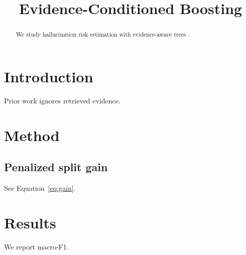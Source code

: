 \documentclass{article}
\begin{document}
\title{Evidence-Conditioned Boosting}
\begin{abstract}
We study hallucination risk estimation with evidence-aware trees \cite{smith2024}.
\end{abstract}
\section{Introduction}
Prior work \cite{smith2024,lee2023} ignores retrieved evidence.
\section{Method}
\subsection{Penalized split gain}
See Equation~\eqref{eq:gain}.
\section{Results}
We report macro-F1.
\end{document}
